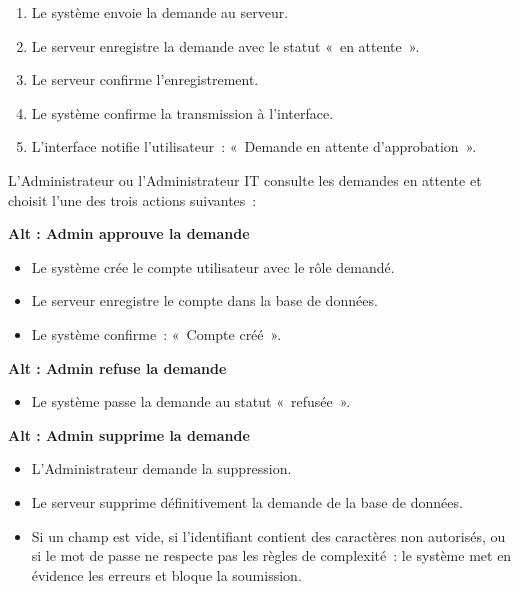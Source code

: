 \documentclass[11pt]{article}
\begin{document}
\begin{description}[leftmargin=4.2cm, style=nextline]
    \item[Alt : champs conformes]
    \begin{enumerate}[leftmargin=*, topsep=0pt, itemsep=0pt, start=4]
        \item Le système envoie la demande au serveur.
        \item Le serveur enregistre la demande avec le statut «~en attente~».
        \item Le serveur confirme l'enregistrement.
        \item Le système confirme la transmission à l'interface.
        \item L'interface notifie l'utilisateur~:
              «~Demande en attente d'approbation~».
    \end{enumerate}

    L'Administrateur ou l'Administrateur IT consulte les demandes en attente
    et choisit l'une des trois actions suivantes~:

    \textbf{Alt : Admin approuve la demande}
    \begin{itemize}[leftmargin=*, nosep]
        \item Le système crée le compte utilisateur avec le rôle demandé.
        \item Le serveur enregistre le compte dans la base de données.
        \item Le système confirme~: «~Compte créé~».
    \end{itemize}

    \textbf{Alt : Admin refuse la demande}
    \begin{itemize}[leftmargin=*, nosep]
        \item Le système passe la demande au statut «~refusée~».
    \end{itemize}

    \textbf{Alt : Admin supprime la demande}
    \begin{itemize}[leftmargin=*, nosep]
        \item L'Administrateur demande la suppression.
        \item Le serveur supprime définitivement la demande de la base de données.
    \end{itemize}

    \item[Alt : champs non conformes]
    \begin{itemize}[leftmargin=*, nosep]
        \item Si un champ est vide, si l'identifiant contient des caractères
              non autorisés, ou si le mot de passe ne respecte pas les règles
              de complexité~: le système met en évidence les erreurs
              et bloque la soumission.
    \end{itemize}


\end{description}
\end{document}
